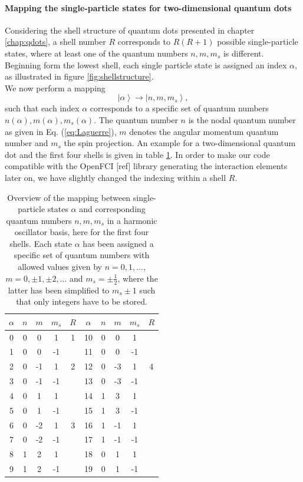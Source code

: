 \paragraph{Mapping the single-particle states for two-dimensional quantum dots}
 
Considering the shell structure of quantum dots presented in chapter \ref{chap:qdots}, a shell number $R$ corresponds to $R(R+1)$ possible single-particle states, where at least one of the quantum numbers $n,m,m_s$ is different. 
Beginning form the lowest shell, each single particle state is assigned an index $\alpha$, as illustrated in figure \ref{fig:shellstructure}. \\
We now perform a mapping
\[
\left| \alpha \right\rangle \rightarrow \left| n,m,m_s \right\rangle,
\]
such that each index $\alpha$ corresponds to a specific set of quantum numbers $n(\alpha),m(\alpha), m_s(\alpha)$. The quantum number $n$  is the nodal quantum number as given in Eq. (\ref{eq:Laguerre}), $m$ denotes the angular momentum quantum number and $m_s$ the spin projection. 
An example for a two-dimensional quantum dot and the first four shells is given in table \ref{tab:mapping3shells}. In order to make our code compatible with the OpenFCI [ref] library generating the interaction elements later on, we have slightly changed the indexing within a shell $R$.

\begin{table}
\begin{center}
\begin{tabular}{c c c c c | c c c c c }
\hline\hline
$\alpha$ & $n$ &  $m$ & $m_s$ & $R$ & $\alpha$ & $n$ &  $m$ & $m_s$ & $R$ \\
\hline
0 & 0 & 0 & 1 & 1 & 10 & 0 & 0 & 1  &\\
1 & 0 & 0 & -1 & & 11 & 0 & 0 & -1  &\\
\hline
2 & 0 & -1 & 1  & 2& 12& 0 & -3 & 1  &4\\
3 & 0 & -1 & -1 &  &13& 0 & -3 & -1  &\\
4 & 0 & 1 & 1  &  &14& 1 & 3 & 1  &\\
5 & 0 & 1 & -1 &  & 15& 1 & 3 & -1 &\\
\cline{1-5}
6 & 0 & -2 & 1  &  3& 16& 1 & -1 & 1  &\\
7 & 0 & -2 & -1 &  &17& 1 & -1 & -1  &\\
8 & 1 & 2 & 1  &  &18& 0 & 1 & 1  &\\
9 & 1 & 2 & -1 &  &19& 0 & 1 & -1  &\\
\hline\hline
\end{tabular}
\end{center}
\caption{ Overview of the mapping between single-particle states $\alpha$ and corresponding quantum numbers $n,m,m_s$ in a harmonic oscillator basis, here for the first four shells. Each state $\alpha$ has been assigned a specific set of quantum numbers with allowed values given by $n = 0,1,...$, $m = 0,\pm 1, \pm 2,\dots$ and $m_s = \pm \frac{1}{2}$, where the latter has been simplified to $m_s \pm 1$ such that only integers have to be stored.}
\label{tab:mapping3shells}
\end{table}

